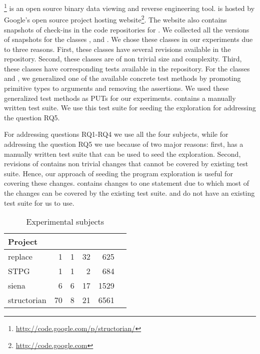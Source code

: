 \footnote{\url{http://code.google.com/p/structorian/}} is an open source binary data viewing and reverse engineering tool.  is hosted by Google's open source project hosting website\footnote{\url{http://code.google.com}}. The website also contains snapshots of check-ins in the code repositories for . We collected all the versions of snapshots for the classes ,  and . We chose these classes in our experiments due to three reasons. First, these classes have several revisions available in the repository. Second, these classes are of non trivial size and complexity. Third, these classes have corresponding tests available in the repository. For the classes  and  , we generalized one of the available concrete test methods by promoting primitive types to arguments and removing the assertions.  We used these generalized test methods as PUTs for our experiments.  contains a manually written test suite. We use this test suite for seeding the exploration for addressing the question RQ5.

For addressing questions RQ1-RQ4 we use all the four subjects, while for addressing the question RQ5 we use  because of two major reasons: first,  has a manually written test suite that can be used to seed the exploration. Second, revisions of  contains non trivial changes that cannot be covered by existing test suite. Hence, our approach of seeding the program exploration is useful for covering these changes.  contains changes to one statement due to which most of the changes can be covered by the existing test suite.  and  do not have an existing test suite for us to use.

\setlength{\tabcolsep}{6pt}
\begin{table}
\begin{CodeOut}
\begin{center}
\caption {\label{table:subjects}Experimental subjects}
\begin {tabular} {|l|r|r|r|r|r|}
\hline
Project&\CenterCell{Classes}&\CenterCell{Classes Covered}&\CenterCell{Versions}&\CenterCell{LOC}\\

\hline
\hline replace &1&1&32&625\\
\hline STPG &1&1&2&684\\
\hline siena &6&6&17&1529\\
\hline structorian &70&8&21&6561\\
\hline
\end{tabular}
\end{center}
\end{CodeOut}
\vspace{- 0.3 in}
\end{table}



